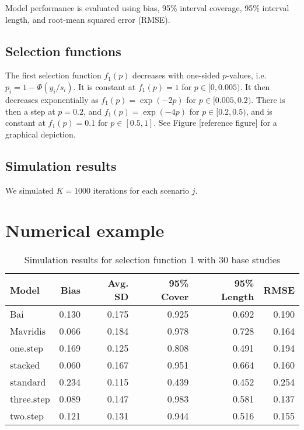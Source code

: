 \documentclass[12pt]{article}   	%
\numberwithin{equation}{section}
\begin{document}
Model performance is evaluated using bias, 95\% interval coverage, 95\% interval length, and root-mean squared error (RMSE). 

\subsection{Selection functions}

The first selection function $f_1(p)$ decreases with one-sided $p$-values, i.e. $p_i = 1 - \Phi(y_i / s_i)$. It is constant at $f_1(p) = 1$ for $p \in [0, 0.005)$. It then decreases exponentially as $f_1(p) = \exp(-2p)$ for $p \in [0.005, 0.2)$. There is then a step at $p=0.2$, and $f_1(p) = \exp(-4p)$ for $p \in [0.2, 0.5)$, and is constant at $f_1(p) = 0.1$ for $p \in [0.5, 1]$. See Figure [reference figure] for a graphical depiction.

\subsection{Simulation results}

We simulated $K=1000$ iterations for each scenario $j$.

\section{Numerical example} \label{sec:numex}





\begin{table}[ht]
\centering
\begin{tabular}{lrrrrr}
  \hline
Model & Bias & Avg. SD & 95\% Cover & 95\% Length & RMSE \\ 
  \hline
Bai & 0.130 & 0.175 & 0.925 & 0.692 & 0.190 \\ 
  Mavridis & 0.066 & 0.184 & 0.978 & 0.728 & 0.164 \\ 
  one.step & 0.169 & 0.125 & 0.808 & 0.491 & 0.194 \\ 
  stacked & 0.060 & 0.167 & 0.951 & 0.664 & 0.160 \\ 
  standard & 0.234 & 0.115 & 0.439 & 0.452 & 0.254 \\ 
  three.step & 0.089 & 0.147 & 0.983 & 0.581 & 0.137 \\ 
  two.step & 0.121 & 0.131 & 0.944 & 0.516 & 0.155 \\ 
   \hline
\end{tabular}
\caption{Simulation results for selection function 1 with 30 base studies}
\end{table}
\end{document}
